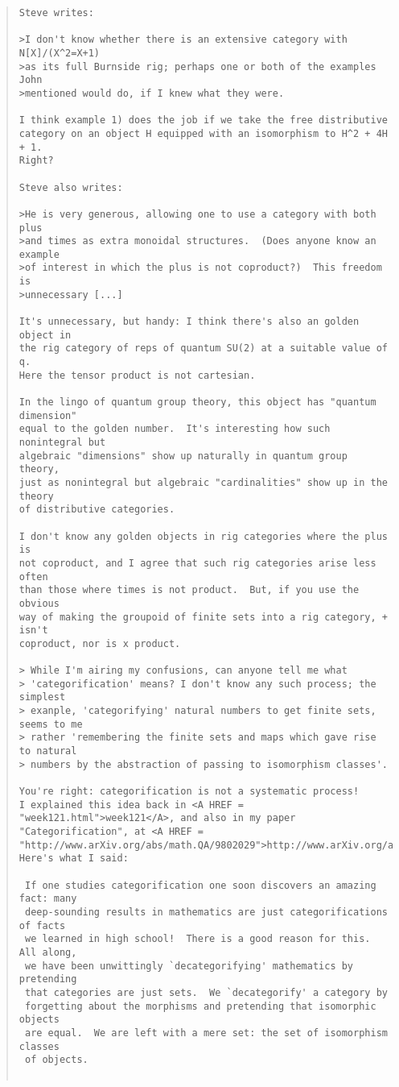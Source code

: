 \begin{quote}
\begin{verbatim}
Steve writes:

>I don't know whether there is an extensive category with N[X]/(X^2=X+1) 
>as its full Burnside rig; perhaps one or both of the examples John 
>mentioned would do, if I knew what they were.

I think example 1) does the job if we take the free distributive
category on an object H equipped with an isomorphism to H^2 + 4H + 1.
Right?

Steve also writes:

>He is very generous, allowing one to use a category with both plus 
>and times as extra monoidal structures.  (Does anyone know an example 
>of interest in which the plus is not coproduct?)  This freedom is 
>unnecessary [...]

It's unnecessary, but handy: I think there's also an golden object in 
the rig category of reps of quantum SU(2) at a suitable value of q.  
Here the tensor product is not cartesian.  

In the lingo of quantum group theory, this object has "quantum dimension"
equal to the golden number.  It's interesting how such nonintegral but 
algebraic "dimensions" show up naturally in quantum group theory, 
just as nonintegral but algebraic "cardinalities" show up in the theory 
of distributive categories.  

I don't know any golden objects in rig categories where the plus is
not coproduct, and I agree that such rig categories arise less often
than those where times is not product.  But, if you use the obvious 
way of making the groupoid of finite sets into a rig category, + isn't 
coproduct, nor is x product.  

> While I'm airing my confusions, can anyone tell me what
> 'categorification' means? I don't know any such process; the simplest
> exanple, 'categorifying' natural numbers to get finite sets, seems to me
> rather 'remembering the finite sets and maps which gave rise to natural
> numbers by the abstraction of passing to isomorphism classes'.

You're right: categorification is not a systematic process!  
I explained this idea back in <A HREF = "week121.html">week121</A>, and also in my paper
"Categorification", at <A HREF = "http://www.arXiv.org/abs/math.QA/9802029">http://www.arXiv.org/abs/math.QA/9802029</A>.  
Here's what I said:

 If one studies categorification one soon discovers an amazing fact: many
 deep-sounding results in mathematics are just categorifications of facts
 we learned in high school!  There is a good reason for this.  All along,
 we have been unwittingly `decategorifying' mathematics by pretending
 that categories are just sets.  We `decategorify' a category by
 forgetting about the morphisms and pretending that isomorphic objects
 are equal.  We are left with a mere set: the set of isomorphism classes
 of objects. 


\end{verbatim}
\end{quote}
